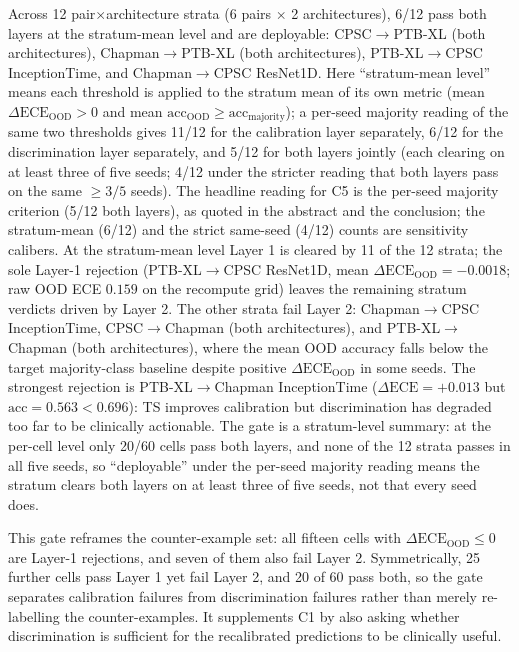 \documentclass[review,12pt,nonatbib]{elsarticle}
\begin{document}
Across 12 pair$\times$architecture strata (6 pairs $\times$ 2
architectures), 6/12 pass both layers at the stratum-mean level and are
deployable: CPSC$\rightarrow$PTB-XL (both architectures),
Chapman$\rightarrow$PTB-XL (both architectures),
PTB-XL$\rightarrow$CPSC InceptionTime, and Chapman$\rightarrow$CPSC
ResNet1D. Here ``stratum-mean level'' means
each threshold is applied to the stratum mean of its own metric (mean
$\Delta\text{ECE}_{\text{OOD}} > 0$ and mean
$\text{acc}_{\text{OOD}} \geq \text{acc}_{\text{majority}}$); a
per-seed majority reading of the same two thresholds gives 11/12 for
the calibration layer separately, 6/12 for the discrimination layer
separately, and 5/12 for both layers jointly (each clearing on at
least three of five seeds; 4/12 under the stricter reading that both
layers pass on the same $\geq 3/5$ seeds). The headline reading for
C5 is the per-seed majority criterion (5/12 both layers), as quoted in
the abstract and the conclusion; the stratum-mean (6/12) and the strict
same-seed (4/12) counts are sensitivity calibers. At the
stratum-mean level Layer 1 is cleared by 11 of the 12 strata; the sole
Layer-1 rejection (PTB-XL$\rightarrow$CPSC ResNet1D, mean
$\Delta\text{ECE}_{\text{OOD}}=-0.0018$; raw OOD ECE $0.159$ on the
recompute grid) leaves the remaining stratum verdicts driven by
Layer 2.
The other strata fail Layer 2:
Chapman$\rightarrow$CPSC InceptionTime,
CPSC$\rightarrow$Chapman (both architectures), and
PTB-XL$\rightarrow$Chapman (both architectures), where the mean OOD
accuracy falls below the target majority-class baseline despite positive
$\Delta\text{ECE}_{\text{OOD}}$ in some seeds. The strongest rejection
is PTB-XL$\rightarrow$Chapman InceptionTime ($\Delta\text{ECE}=+0.013$ but
$\text{acc}=0.563 < 0.696$): TS improves calibration but
discrimination has degraded too far to be clinically actionable. The
gate is a stratum-level summary: at the per-cell level only 20/60 cells
pass both layers, and none of the 12 strata passes in all five
seeds, so ``deployable'' under the per-seed majority reading means the
stratum clears both layers on at least three of five seeds, not
that every seed does.

This gate reframes the counter-example set: all fifteen cells with
$\Delta\text{ECE}_{\text{OOD}} \leq 0$ are Layer-1 rejections, and seven
of them also fail Layer 2. Symmetrically, 25 further cells pass Layer 1
yet fail Layer 2, and 20 of 60 pass both, so the gate separates
calibration failures from discrimination failures rather than merely
re-labelling the counter-examples. It supplements C1 by also asking
whether discrimination is sufficient for the recalibrated predictions
to be clinically useful.
\end{document}
